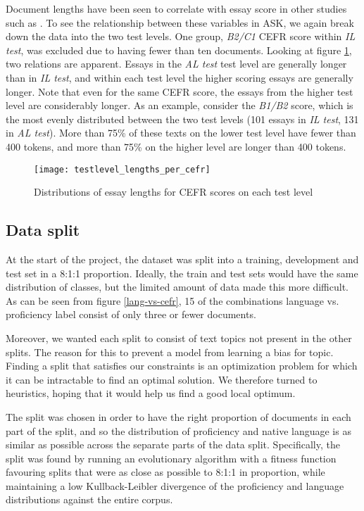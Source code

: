 Document lengths have been seen to correlate with essay score in other
studies such as \textcite{vajjala17}. To see the relationship between these
variables in ASK, we again break down the data into the two test levels. One
group, \emph{B2/C1} CEFR score within \emph{IL test}, was excluded due to
having fewer than ten documents. Looking at figure
\ref{testlevel-lengths-per-cefr}, two relations are apparent. Essays in the
\emph{AL test} test level are generally longer than in \emph{IL test}, and
within each test level the higher scoring essays are generally longer. Note
that even for the same CEFR score, the essays from the higher test level are
considerably longer. As an example, consider the \emph{B1/B2} score, which is
the most evenly distributed between the two test levels (101 essays in
\emph{IL test}, 131 in \emph{AL test}). More than 75\% of these texts on
the lower test level have fewer than 400 tokens, and more than 75\% on the
higher level are longer than 400 tokens.

\begin{figure}
  \centering
  \texttt{[image: testlevel\_lengths\_per\_cefr]}
  \caption{Distributions of essay lengths for CEFR scores on each test level}
  \label{testlevel-lengths-per-cefr}
\end{figure}


\subsection{Data split}

At the start of the project, the dataset was split into a training,
development and test set in a 8:1:1 proportion. Ideally, the train and test
sets would have the same distribution of classes, but the limited amount of
data made this more difficult. As can be seen from figure \ref{lang-vs-cefr},
15 of the combinations language vs. proficiency label consist of only three
or fewer documents.

Moreover, we wanted each split to consist of text topics not present in the
other splits. The reason for this to prevent a model from learning a bias for
topic. Finding a split that satisfies our constraints is an optimization
problem for which it can be intractable to find an optimal solution. We
therefore turned to heuristics, hoping that it would help us find a good
local optimum.
 
The split was chosen in order to have the right proportion of documents in
each part of the split, and so the distribution of proficiency and native
language is as similar as possible across the separate parts of the data
split. Specifically, the split was found by running an evolutionary algorithm
with a fitness function favouring splits that were as close as possible to
8:1:1 in proportion, while maintaining a low Kullback-Leibler divergence of
the proficiency and language distributions against the entire corpus.

